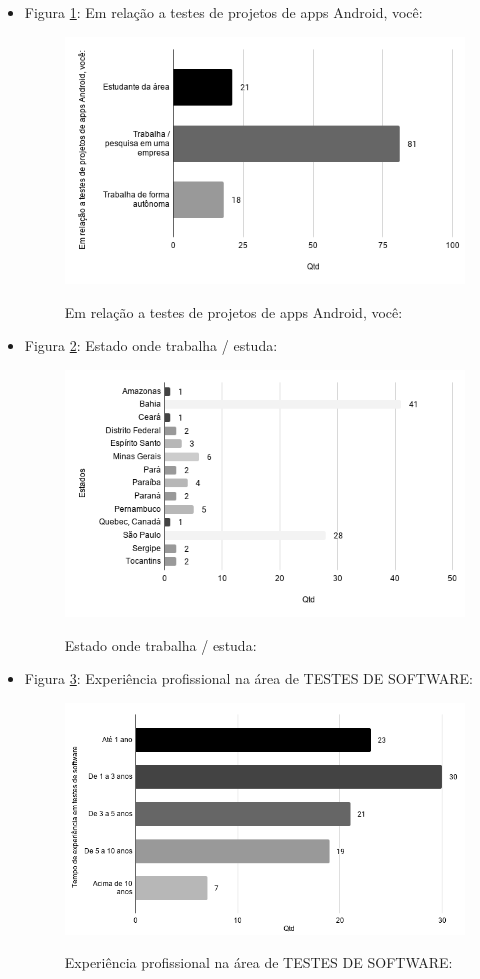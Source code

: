 \begin{itemize}
    
    \item Figura \ref{figure:s_projetos}: Em relação a testes de projetos de apps Android, você:
    \begin{figure}[!htb]
    \centering
    \includegraphics[width=.55\textwidth]{images/s_projetos.png}
    \label{figure:s_projetos}
    \caption{Em relação a testes de projetos de apps Android, você:}
    \end{figure}
    
    
    \item Figura \ref{figure:s_estado}: Estado onde trabalha / estuda:
    \begin{figure}[!htb]
    \centering
    \includegraphics[width=.55\textwidth]{images/s_estado.png}
    \label{figure:s_estado}
    \caption{Estado onde trabalha / estuda:}
    \end{figure}


    \item Figura \ref{figure:s_experienciatestes}: Experiência profissional na área de TESTES DE SOFTWARE:
    \begin{figure}[!htb]
    \centering
    \includegraphics[width=.55\textwidth]{images/s_experienciatestes.png}
    \label{figure:s_experienciatestes}
    \caption{Experiência profissional na área de TESTES DE SOFTWARE:}
    \end{figure}
    


\end{itemize}
